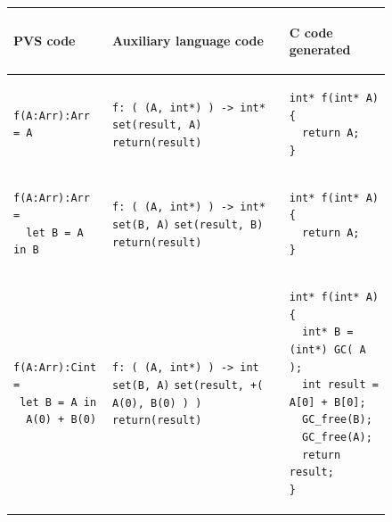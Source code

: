 \documentclass[12pt,a4paper,titlepage]{article}
\newcommand{\cl}[1]{\texttt{#1}}
\begin{document}
\begin{figure}[h!]
\begin{tabular}{|p{5.2cm}|p{5.8cm}|p{6cm}|}
\hline
\begin{center}
PVS code
\end{center} &
\begin{center}
Auxiliary language code
\end{center} &
\begin{center}
C code generated
\end{center} \\ \hline

\begin{lstlisting}
f(A:Arr):Arr = A
\end{lstlisting} &
\cl{f: ( (A, int*) ) -> int*} \newline
\cl{set(result, A)} \newline
\cl{return(result)} &
\begin{lstlisting}
int* f(int* A) {
  return A;
}
\end{lstlisting} \\ \hline

\begin{lstlisting}
f(A:Arr):Arr =
  let B = A in B
\end{lstlisting} &
\cl{f: ( (A, int*) ) -> int*} \newline
\cl{set(B, A)} \newline
\cl{set(result, B)} \newline
\cl{return(result)} &
\begin{lstlisting}
int* f(int* A) {
  return A;
}
\end{lstlisting} \\ \hline

\begin{lstlisting}
f(A:Arr):Cint =
 let B = A in
  A(0) + B(0)
\end{lstlisting} &
\cl{f: ( (A, int*) ) -> int} \newline
\cl{set(B, A)} \newline
\cl{set(result, +( A(0), B(0) ) )} \newline
\cl{return(result)} &
\begin{lstlisting}
int* f(int* A) {
  int* B = (int*) GC( A );
  int result = A[0] + B[0];
  GC_free(B);
  GC_free(A);
  return result;
}
\end{lstlisting} \\ \hline


\end{tabular}
\end{figure}
\end{document}
